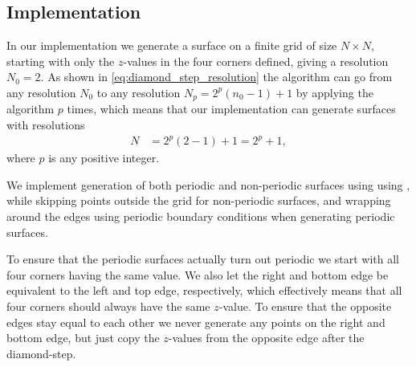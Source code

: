 \subsection{Implementation\label{subsec:SRA_implementation}}
In our implementation we generate a surface on a finite grid of size $N\times N$, starting with only the $z$-values in the four corners defined, giving a resolution $N_0 = 2$. As shown in \cref{eq:diamond_step_resolution} the algorithm can go from any resolution $N_0$ to any resolution $N_p = 2^p(n_0-1) + 1$ by applying the algorithm $p$ times, which means that our implementation can generate surfaces with resolutions
\begin{align*}
    N &= 2^p(2-1) + 1 = 2^p + 1,
\end{align*}
where $p$ is any positive integer.

We implement generation of both periodic and non-periodic surfaces using using , while skipping points outside the grid for non-periodic surfaces, and wrapping around the edges using periodic boundary conditions when generating periodic surfaces.

To ensure that the periodic surfaces actually turn out periodic we start with all four corners having the same value. We also let the right and bottom edge be equivalent to the left and top edge, respectively, which effectively means that all four corners should always have the same $z$-value. To ensure that the opposite edges stay equal to each other we never generate any points on the right and bottom edge, but just copy the $z$-values from the opposite edge after the diamond-step.

